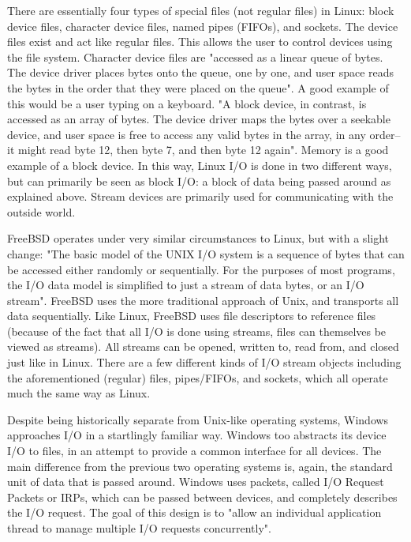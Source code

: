 \documentclass[10pt,draftclsnofoot,onecolumn]{IEEEtran}
\begin{document}
    There are essentially four types of special files (not regular files) in Linux: block device files, character device files, named pipes (FIFOs), and sockets. The device files exist and act like regular files. This allows the user to control devices using the file system. Character device files are "accessed as a linear queue of bytes. The device driver places bytes onto the queue, one by one, and user space reads the bytes in the order that they were placed on the queue"\cite{love_2014}. A good example of this would be a user typing on a keyboard. "A block device, in contrast, is accessed as an array of bytes. The device driver maps the bytes over a seekable device, and user space is free to access any valid bytes in the array, in any order--it might read byte 12, then byte 7, and then byte 12 again"\cite{love_2014}. Memory is a good example of a block device. In this way, Linux I/O is done in two different ways, but can primarily be seen as block I/O: a block of data being passed around as explained above. Stream devices are primarily used for communicating with the outside world.\par
    FreeBSD operates under very similar circumstances to Linux, but with a slight change: "The basic model of the UNIX I/O system is a sequence of bytes that can be accessed either randomly or sequentially. For the purposes of most programs, the I/O data model is simplified to just a stream of data bytes, or an I/O stream"\cite{mckusick_neville-neil_watson_mckusick_2015}. FreeBSD uses the more traditional approach of Unix, and transports all data sequentially.
    Like Linux, FreeBSD uses file descriptors to reference files (because of the fact that all I/O is done using streams, files can themselves be viewed as streams). All streams can be opened, written to, read from, and closed just like in Linux. There are a few different kinds of I/O stream objects including the aforementioned (regular) files, pipes/FIFOs, and sockets, which all operate much the same way as Linux.\par
    Despite being historically separate from Unix-like operating systems, Windows approaches I/O in a startlingly familiar way. Windows too abstracts its device I/O to files, in an attempt to provide a common interface for all devices. The main difference from the previous two operating systems is, again, the standard unit of data that is passed around. Windows uses packets, called I/O Request Packets or IRPs, which can be passed between devices, and completely describes the I/O request. The goal of this design is to "allow an individual application thread to manage multiple I/O requests concurrently"\cite{russinovich_solomon_ionescu_2012}.
\end{document}

